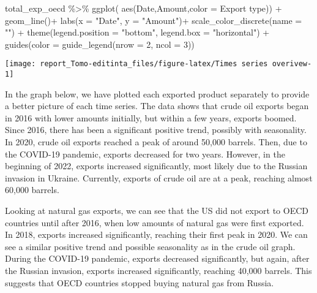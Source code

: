 \documentclass[
]{article}
\newenvironment{Shaded}{\begin{snugshade}}{\end{snugshade}}
\newcommand{\AttributeTok}[1]{\textcolor[rgb]{0.77,0.63,0.00}{#1}}
\newcommand{\DecValTok}[1]{\textcolor[rgb]{0.00,0.00,0.81}{#1}}
\newcommand{\FunctionTok}[1]{\textcolor[rgb]{0.00,0.00,0.00}{#1}}
\newcommand{\NormalTok}[1]{#1}
\newcommand{\SpecialCharTok}[1]{\textcolor[rgb]{0.00,0.00,0.00}{#1}}
\newcommand{\StringTok}[1]{\textcolor[rgb]{0.31,0.60,0.02}{#1}}
\begin{document}
\begin{Shaded}
\begin{Highlighting}[]
\NormalTok{total\_exp\_oecd }\SpecialCharTok{\%\textgreater{}\%} \FunctionTok{ggplot}\NormalTok{(}
 \FunctionTok{aes}\NormalTok{(Date,Amount,}\AttributeTok{color =} \StringTok{\textasciigrave{}}\AttributeTok{Export type}\StringTok{\textasciigrave{}}\NormalTok{)) }\SpecialCharTok{+}
   \FunctionTok{geom\_line}\NormalTok{()}\SpecialCharTok{+}
   \FunctionTok{labs}\NormalTok{(}\AttributeTok{x =} \StringTok{"Date"}\NormalTok{, }\AttributeTok{y =} \StringTok{"Amount"}\NormalTok{)}\SpecialCharTok{+}
    \FunctionTok{scale\_color\_discrete}\NormalTok{(}\AttributeTok{name =} \StringTok{""}\NormalTok{) }\SpecialCharTok{+}
  \FunctionTok{theme}\NormalTok{(}\AttributeTok{legend.position =} \StringTok{"bottom"}\NormalTok{, }\AttributeTok{legend.box =} \StringTok{"horizontal"}\NormalTok{) }\SpecialCharTok{+}
  \FunctionTok{guides}\NormalTok{(}\AttributeTok{color =} \FunctionTok{guide\_legend}\NormalTok{(}\AttributeTok{nrow =} \DecValTok{2}\NormalTok{, }\AttributeTok{ncol =} \DecValTok{3}\NormalTok{))}
\end{Highlighting}
\end{Shaded}

\begin{center}\texttt{[image: report\_Tomo-editinta\_files/figure-latex/Times series overivew-1]} \end{center}

In the graph below, we have plotted each exported product separately to
provide a better picture of each time series. The data shows that crude
oil exports began in 2016 with lower amounts initially, but within a few
years, exports boomed. Since 2016, there has been a significant positive
trend, possibly with seasonality. In 2020, crude oil exports reached a
peak of around 50,000 barrels. Then, due to the COVID-19 pandemic,
exports decreased for two years. However, in the beginning of 2022,
exports increased significantly, most likely due to the Russian invasion
in Ukraine. Currently, exports of crude oil are at a peak, reaching
almost 60,000 barrels.

Looking at natural gas exports, we can see that the US did not export to
OECD countries until after 2016, when low amounts of natural gas were
first exported. In 2018, exports increased significantly, reaching their
first peak in 2020. We can see a similar positive trend and possible
seasonality as in the crude oil graph. During the COVID-19 pandemic,
exports decreased significantly, but again, after the Russian invasion,
exports increased significantly, reaching 40,000 barrels. This suggests
that OECD countries stopped buying natural gas from Russia.
\end{document}
